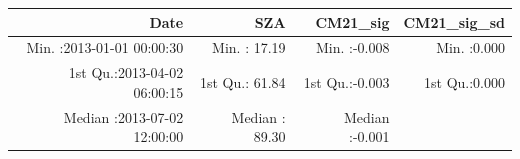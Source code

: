 \documentclass[
  10pt,
  a4paper,oneside]{article}
\begin{document}
\begin{longtable}[]{@{}rrrr@{}}
\toprule
\begin{minipage}[b]{0.33\columnwidth}\raggedleft
Date\strut
\end{minipage} & \begin{minipage}[b]{0.19\columnwidth}\raggedleft
SZA\strut
\end{minipage} & \begin{minipage}[b]{0.19\columnwidth}\raggedleft
CM21\_sig\strut
\end{minipage} & \begin{minipage}[b]{0.19\columnwidth}\raggedleft
CM21\_sig\_sd\strut
\end{minipage}\tabularnewline
\midrule
\endhead
\begin{minipage}[t]{0.33\columnwidth}\raggedleft
Min. :2013-01-01 00:00:30\strut
\end{minipage} & \begin{minipage}[t]{0.19\columnwidth}\raggedleft
Min. : 17.19\strut
\end{minipage} & \begin{minipage}[t]{0.19\columnwidth}\raggedleft
Min. :-0.008\strut
\end{minipage} & \begin{minipage}[t]{0.19\columnwidth}\raggedleft
Min. :0.000\strut
\end{minipage}\tabularnewline
\begin{minipage}[t]{0.33\columnwidth}\raggedleft
1st Qu.:2013-04-02 06:00:15\strut
\end{minipage} & \begin{minipage}[t]{0.19\columnwidth}\raggedleft
1st Qu.: 61.84\strut
\end{minipage} & \begin{minipage}[t]{0.19\columnwidth}\raggedleft
1st Qu.:-0.003\strut
\end{minipage} & \begin{minipage}[t]{0.19\columnwidth}\raggedleft
1st Qu.:0.000\strut
\end{minipage}\tabularnewline
\begin{minipage}[t]{0.33\columnwidth}\raggedleft
Median :2013-07-02 12:00:00\strut
\end{minipage} & \begin{minipage}[t]{0.19\columnwidth}\raggedleft
Median : 89.30\strut
\end{minipage} & \begin{minipage}[t]{0.19\columnwidth}\raggedleft
Median :-0.001\strut
\end{minipage} & \begin{minipage}[t]{0.19\columnwidth}\raggedleft

\end{minipage}
\end{longtable}
\end{document}
